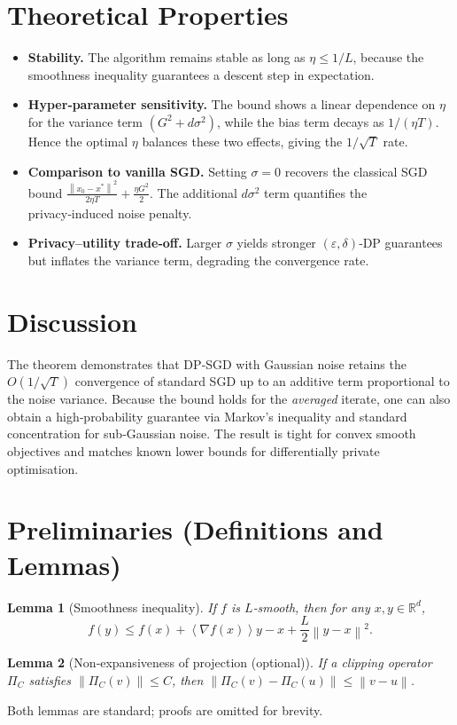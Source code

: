 \documentclass[11pt]{article}
\newtheorem{lemma}{Lemma}
\newcommand{\R}{\mathbb{R}}
\newcommand{\norm}[1]{\left\lVert #1 \right\rVert}
\newcommand{\inner}[1]{\left\langle #1 \right\rangle}
\begin{document}
\section*{Theoretical Properties}
\begin{itemize}
    \item \textbf{Stability.} The algorithm remains stable as long as $\eta\le 1/L$,
    because the smoothness inequality guarantees a descent step in expectation.
    \item \textbf{Hyper‑parameter sensitivity.}
    The bound shows a linear dependence on $\eta$ for the variance term
    $(G^{2}+d\sigma^{2})$, while the bias term decays as $1/(\eta T)$.
    Hence the optimal $\eta$ balances these two effects, giving the $1/\sqrt{T}$ rate.
    \item \textbf{Comparison to vanilla SGD.}
    Setting $\sigma=0$ recovers the classical SGD bound
    $\frac{\norm{x_{0}-x^{*}}^{2}}{2\eta T}+ \frac{\eta G^{2}}{2}$.
    The additional $d\sigma^{2}$ term quantifies the privacy‑induced noise penalty.
    \item \textbf{Privacy–utility trade‑off.}
    Larger $\sigma$ yields stronger $(\varepsilon,\delta)$‑DP guarantees but
    inflates the variance term, degrading the convergence rate.
\end{itemize}

\section*{Discussion}
The theorem demonstrates that DP‑SGD with Gaussian noise retains the
$O(1/\sqrt{T})$ convergence of standard SGD up to an additive term proportional
to the noise variance.  Because the bound holds for the \emph{averaged}
iterate, one can also obtain a high‑probability guarantee via Markov’s
inequality and standard concentration for sub‑Gaussian noise.
The result is tight for convex smooth objectives and matches known lower
bounds for differentially private optimisation.

\newpage
\section*{Preliminaries (Definitions and Lemmas)}
\begin{lemma}[Smoothness inequality]\label{lem:smooth}
If $f$ is $L$‑smooth, then for any $x,y\in\R^{d}$,
\[
f(y)\le f(x)+\inner{\nabla f(x)}{y-x}+\frac{L}{2}\norm{y-x}^{2}.
\]
\end{lemma}
\begin{lemma}[Non‑expansiveness of projection (optional)]\label{lem:proj}
If a clipping operator $\Pi_{C}$ satisfies $\norm{\Pi_{C}(v)}\le C$, then
$\norm{\Pi_{C}(v)-\Pi_{C}(u)}\le \norm{v-u}$.
\end{lemma}
Both lemmas are standard; proofs are omitted for brevity.
\end{document}
